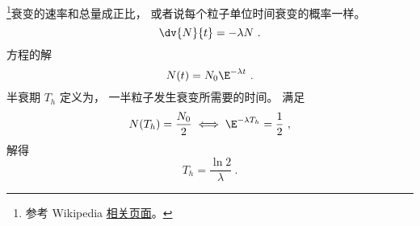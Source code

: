 
\begin{issues}
\issueDraft
\end{issues}



\footnote{参考 Wikipedia \href{https://en.wikipedia.org/wiki/Exponential_decay}{相关页面}。}衰变的速率和总量成正比， 或者说每个粒子单位时间衰变的概率一样。
\begin{equation}
\dv{N}{t} = -\lambda N~.
\end{equation}
方程的解
\begin{equation}
N(t) = N_0 \E^{-\lambda t}~.
\end{equation}
半衰期 $T_h$ 定义为， 一半粒子发生衰变所需要的时间。 满足
\begin{equation}
N(T_h) = \frac{N_0}{2} \iff \E^{-\lambda T_h} = \frac{1}{2}~,
\end{equation}
解得
\begin{equation}
T_h = \frac{\ln 2}{\lambda}~.
\end{equation}

